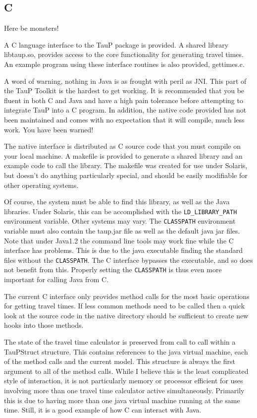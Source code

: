 \subsection{C}

Here be monsters!

A C language interface to the TauP package is provided. A shared library
libtaup.so, provides access to the core functionality for generating travel
times. An example program using these interface routines is also provided,
gettimes.c.

A word of warning, nothing in Java is as frought with peril as JNI. This part of the TauP Toolkit is the hardest to get working. It is recommended that you be
fluent in both C and Java and have a high pain tolerance before attempting to
integrate TauP into a C program. In addition, the native code provided has not
been maintained and comes with no expectation that it will compile, much less work.
 You have been warned!


The native interface is distributed as C source code that you must compile
on your local machine. A makefile is provided to generate a shared library
and an example code to call the library. The makefile was created for use under
Solaris, but doesn't do anything particularly special, and should be
easily modifiable for other operating systems.

Of course, the system must be able to find this library, as well as the
Java libraries. Under Solaris, this can be accomplished with the
\texttt{LD\_LIBRARY\_PATH} environment variable. Other systems may vary.
The \texttt{CLASSPATH}  environment variable must also contain the taup.jar
file as well as the default java jar files. Note that under Java1.2 the command
line tools may work fine while the C interface has problems. This is due to
the java executable finding the standard files without the \texttt{CLASSPATH}.
The C interface bypasses the executable, and so does not benefit from this.
Properly setting the \texttt{CLASSPATH} is thus even more important for calling
Java from C.

The current C interface only provides method calls for the most basic
operations for getting travel times. If less common methods need to be called
then a quick look at the source code in the native directory
should be sufficient to create new hooks into those methods.

The state of the travel time calculator is preserved from call to call within
a TauPStruct structure. This contains references to the java virtual machine,
each of the method calls and the current model. This structure is always
the first argument to all of the method calls. While I believe this is the
least complicated style of interaction, it is not particularly memory
or processor efficient for uses involving more than one travel time calculator
active simultaneously. Primarily this is due to having more than one
java virtual machine running at the same time. Still, it is a
good example of how C can interact with Java.

